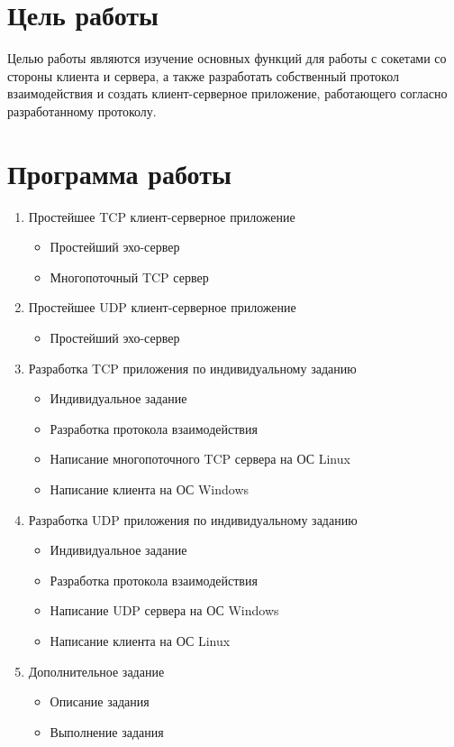 







\section{Цель работы}
Целью работы являются изучение основных функций для работы с сокетами со стороны клиента и сервера, а также разработать собственный протокол взаимодействия и создать клиент-серверное приложение, работающего согласно разработанному протоколу.

\section{Программа работы}

\begin{enumerate}
\item Простейшее TCP клиент-серверное приложение
\begin{itemize}
\item Простейший эхо-сервер
\item Многопоточный TCP сервер
\end{itemize}

\item Простейшее UDP клиент-серверное приложение
\begin{itemize}
\item Простейший эхо-сервер
\end{itemize}

\item Разработка TCP приложения по индивидуальному заданию
\begin{itemize}
\item Индивидуальное задание
\item Разработка протокола взаимодействия
\item Написание многопоточного TCP сервера на ОС Linux
\item Написание клиента на ОС Windows
\end{itemize}

\item Разработка UDP приложения по индивидуальному заданию
\begin{itemize}
\item Индивидуальное задание
\item Разработка протокола взаимодействия
\item Написание UDP сервера на ОС Windows
\item Написание клиента на ОС Linux
\end{itemize}

\item Дополнительное задание
\begin{itemize}
\item Описание задания
\item Выполнение задания
\end{itemize}
\end{enumerate}

